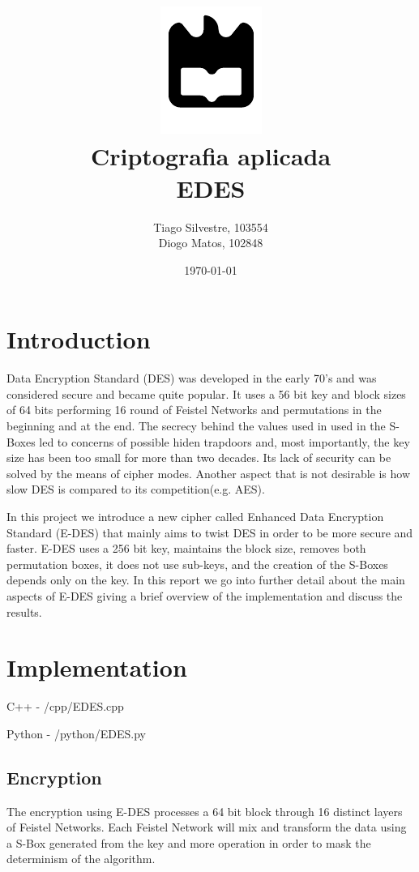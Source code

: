 \documentclass{article} %
\title{%
    \includegraphics[width=0.3\linewidth]{./assets/logo.pdf}\\[20pt]
    \Huge \bfseries Criptografia aplicada \\[10pt]
    \Large EDES
}
\author{Tiago Silvestre, 103554 \\ Diogo Matos, 102848}
\date{\today}
\begin{document}
\maketitle

\newpage

\tableofcontents

\clearpage

\section{Introduction}
Data Encryption Standard (DES) was developed in the early 70's and was considered secure and became quite popular. It uses a 56 bit key and block sizes of 64 bits performing 
16 round of Feistel Networks and permutations in the beginning and at the end. The secrecy behind the values used in used in the S-Boxes led to concerns of possible
hiden trapdoors and, most importantly, the key size has been too small for more than two decades. Its lack of security can be solved by the means of cipher modes. Another
aspect that is not desirable is how slow DES is compared to its competition(e.g. AES).

In this project we introduce a new cipher called Enhanced Data Encryption Standard (E-DES) that mainly aims to twist DES in order to be more secure and faster. 
E-DES uses a 256 bit key, maintains the block size, removes both permutation boxes, it does not use sub-keys, and the creation of the S-Boxes depends only on the key. In this report we go into 
further detail about the main aspects of E-DES giving a brief overview of the implementation and discuss the results.

\section{Implementation}
\begin{tcolorbox}
  [width=\linewidth, colback=white!95!black, boxrule=0pt]
  C++    - /cpp/EDES.cpp

  Python - /python/EDES.py
\end{tcolorbox}


\subsection{Encryption}
The encryption using E-DES processes a 64 bit block through 16 distinct layers of Feistel Networks. 
Each Feistel Network will mix and transform the data using a S-Box generated from the key and more
operation in order to mask the determinism of the algorithm. 
\end{document}
